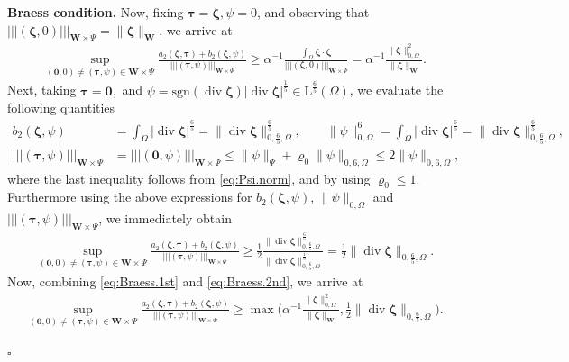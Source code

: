 \documentclass[11pt, reqno, a4paper, twoside]{article}
\newcommand*\tnorm[1]{|\!|\!| #1 |\!|\!|}
\newcommand\bzeta{\boldsymbol{\zeta}}
\newcommand\bzero{\boldsymbol{0}}
\newcommand\btau{\boldsymbol{\tau}}
\newcommand{\rL}{\mathrm{L}}
\newcommand{\bW}{\mathbf{W}}
\newcommand\vdiv{\mathop{\mathrm{div}}\nolimits}
\newenvironment{proof}{\noindent{\it Proof.}}{\hfill$\square$}
\numberwithin{equation}{section}
\numberwithin{remark}{section}
\numberwithin{figure}{section}
\numberwithin{table}{section}
\begin{document}
{\begin{proof}
\smallskip
\noindent\textbf{Braess condition.} Now, fixing  \(\btau=\bzeta,\psi=0\), and observing that \(\tnorm{(\bzeta,0)}_{\bW\times \Psi}=\|\bzeta\|_{\bW}\), we arrive at  
\begin{align}\label{eq:Braess.1st}
\sup_{(\bzero,0)\neq(\btau,\psi)\in\bW\times\Psi}\frac{a_2(\bzeta,\btau)+b_2(\bzeta,\psi)}{\tnorm{(\btau,\psi)}_{\bW\times\Psi}} \geq \alpha^{-1}\frac{\int_\Omega \bzeta\cdot \bzeta}{\tnorm{(\bzeta,0)}_{\bW\times\Psi}}=\alpha^{-1}\frac{\|\bzeta\|^2_{0,\Omega}}{\|\bzeta\|_{\bW}}.
\end{align}
 Next, taking \(\btau = \bzero,\) and \(\psi=\mathrm{sgn}(\vdiv\bzeta)|\vdiv\bzeta|^{\frac15}{\in\rL^{\frac65}(\Omega)}\), 
we evaluate the following quantities 
\begin{align*}
   b_2(\boldsymbol{\zeta}, \psi)
  &= \int_{\Omega} |\operatorname{div} \boldsymbol{\zeta}|^{\frac{6}{5}}
  = \|\operatorname{div} \boldsymbol{\zeta}\|_{0,\frac{6}{5},\Omega}^{\frac{6}{5}}, 
  \quad \quad \|\psi\|^6_{0,\Omega}
  = \int_\Omega|\vdiv\bzeta|^{\frac65}=\|\operatorname{div} \boldsymbol{\zeta}\|^{\frac65}_{0,\frac65,\Omega},
  \\
    \tnorm{(\btau, \psi)}_{\boldsymbol{W} \times \Psi}
  &= \tnorm{(\boldsymbol{0}, \psi)}_{\boldsymbol{W} \times \Psi}
  {\leq} \|\psi\|_{\Psi} + {\varrho_0}\|\psi\|_{0,6,\Omega}
  \leq {2}\|\psi\|_{0,6,\Omega},  
\end{align*}
where {the last inequality follows from \eqref{eq:Psi.norm}, and by using $\varrho_0\leq 1$}. 
 Furthermore using {the {above} expressions} for \(b_2(\boldsymbol{\zeta}, \psi),\,\|\psi\|_{0,\Omega}\) and \(\tnorm{(\btau, \psi)}_{\boldsymbol{W} \times \Psi}\), we immediately obtain 
\begin{align}\label{eq:Braess.2nd} \sup_{(\bzero,0)\neq(\btau,\psi)\in\bW\times\Psi}\frac{a_2(\bzeta,\btau)+b_2(\bzeta,\psi)}{\tnorm{(\btau,\psi)}_{\bW\times\Psi}} \geq{\frac12} \frac{\|\vdiv \bzeta\|^{\frac65}_{0,\frac65,\Omega}}{\|\vdiv \bzeta\|^{\frac15}_{0,\frac65,\Omega}}={\frac12}\|\vdiv \bzeta\|_{0,\frac65,\Omega}.
\end{align}
Now, combining \eqref{eq:Braess.1st} and \eqref{eq:Braess.2nd}, we arrive at 
\begin{align}\label{eq:Braess.3rd}
\sup_{(\bzero,0)\neq(\btau,\psi)\in\bW\times\Psi}\frac{a_2(\bzeta,\btau)+b_2(\bzeta,\psi)}{\tnorm{(\btau,\psi)}_{\bW\times\Psi}}\geq\max\bigl(\alpha^{-1}{\frac{\|\bzeta\|^2_{0,\Omega}}{\|\bzeta\|_{\bW}},{\frac12}\|\vdiv \bzeta\|_{0,\frac65,\Omega}}\bigr).
\end{align}

\end{proof}}
\end{document}
